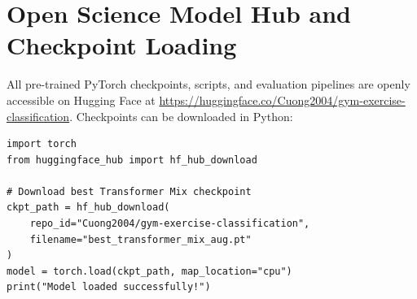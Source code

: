 \documentclass[runningheads]{llncs}
\begin{document}
\section{Open Science Model Hub and Checkpoint Loading}
\label{app:open_science}

All pre-trained PyTorch \cite{paszke2019} checkpoints, scripts, and evaluation pipelines are openly accessible on Hugging Face at \url{https://huggingface.co/Cuong2004/gym-exercise-classification}. Checkpoints can be downloaded in Python:

\begin{verbatim}
import torch
from huggingface_hub import hf_hub_download

# Download best Transformer Mix checkpoint
ckpt_path = hf_hub_download(
    repo_id="Cuong2004/gym-exercise-classification",
    filename="best_transformer_mix_aug.pt"
)
model = torch.load(ckpt_path, map_location="cpu")
print("Model loaded successfully!")
\end{verbatim}
\end{document}
